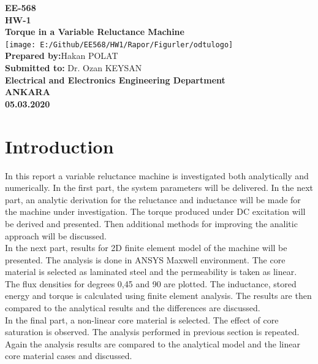 \documentclass{article}
\begin{document}
\begin{titlepage}
	\begin{center}
		\Huge\textbf{EE-568 }\\
		\vspace{0.5cm}
		\Huge\textbf{HW-1}\\
		\vspace{0.5cm}
		\Huge\textbf{Torque in a Variable Reluctance Machine}\\
		\vspace{0.5cm}
		\texttt{[image: E:/Github/EE568/HW1/Rapor/Figurler/odtulogo]}\\
		
		
		\Large\textbf{Prepared by:}Hakan POLAT\\
		
		\Large\textbf{Submitted to:} Dr. Ozan KEYSAN\\
		\vspace{0.5cm}
		\Large\textbf{Electrical and Electronics Engineering Department}\\
		
		\large\textbf{ANKARA	}\\
		\large\textbf{05.03.2020}\\
		
		
		
	\end{center}
	
	

\end{titlepage}

\newpage
\section{Introduction}
In this report a variable reluctance machine is investigated both analytically and numerically. In the first part, the system parameters will be delivered. In the next part, an analytic derivation for the reluctance and inductance will be made for the machine under investigation. The torque produced under DC excitation will be derived and presented. Then additional methods for improving the analitic approach will be discussed.\\
In the next part, results for 2D finite element model of the machine will be presented. The analysis is done in ANSYS Maxwell environment. The core material is selected as laminated steel and the permeability is taken as linear. The flux densities for degrees 0,45 and 90 are plotted. The inductance, stored energy and torque is calculated using finite element analysis. The results are then compared to the analytical results and the differences are discussed. \\
In the final part, a non-linear core material is selected. The effect of core saturation is observed. The analysis performed in previous section is repeated. Again the analysis results are compared to the analytical model and the linear core material cases and discussed.
\end{document}
